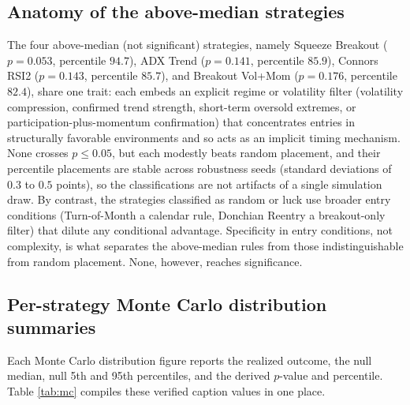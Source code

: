 \documentclass[preprint,12pt]{elsarticle}
\theoremstyle{definition}
\begin{document}
\subsection{Anatomy of the above-median strategies}

The four above-median (not significant) strategies, namely Squeeze Breakout ($p=0.053$, percentile $94.7$), ADX Trend ($p=0.141$, percentile $85.9$), Connors RSI2 ($p=0.143$, percentile $85.7$), and Breakout Vol+Mom ($p=0.176$, percentile $82.4$), share one trait: each embeds an explicit regime or volatility filter (volatility compression, confirmed trend strength, short-term oversold extremes, or participation-plus-momentum confirmation) that concentrates entries in structurally favorable environments and so acts as an implicit timing mechanism. None crosses $p\le0.05$, but each modestly beats random placement, and their percentile placements are stable across robustness seeds (standard deviations of $0.3$ to $0.5$ points), so the classifications are not artifacts of a single simulation draw. By contrast, the strategies classified as random or luck use broader entry conditions (Turn-of-Month a calendar rule, Donchian Reentry a breakout-only filter) that dilute any conditional advantage. Specificity in entry conditions, not complexity, is what separates the above-median rules from those indistinguishable from random placement. None, however, reaches significance.

\subsection{Per-strategy Monte Carlo distribution summaries}

Each Monte Carlo distribution figure reports the realized outcome, the null median, null 5th and 95th percentiles, and the derived $p$-value and percentile. Table \ref{tab:mc} compiles these verified caption values in one place.
\end{document}
